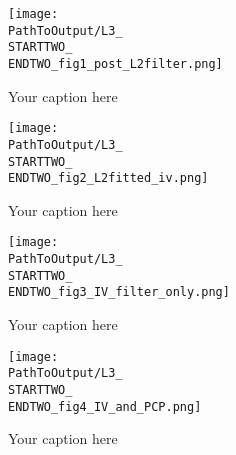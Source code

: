 \begin{appendix}
\begin{figure}[H] %
  \centering
  \texttt{[image: \\PathToOutput/L3\_\\STARTTWO\_\\ENDTWO\_fig1\_post\_L2filter.png]}%
  \caption{Your caption here}
  \label{fig:your_label}
\end{figure}


\begin{figure}[H] %
  \centering
  \texttt{[image: \\PathToOutput/L3\_\\STARTTWO\_\\ENDTWO\_fig2\_L2fitted\_iv.png]}%
  \caption{Your caption here}
  \label{fig:your_label}
\end{figure}


\begin{figure}[H] %
  \centering
  \texttt{[image: \\PathToOutput/L3\_\\STARTTWO\_\\ENDTWO\_fig3\_IV\_filter\_only.png]}%
  \caption{Your caption here}
  \label{fig:your_label}
\end{figure}


\begin{figure}[H] %
  \centering
  \texttt{[image: \\PathToOutput/L3\_\\STARTTWO\_\\ENDTWO\_fig4\_IV\_and\_PCP.png]}%
  \caption{Your caption here}
  \label{fig:your_label}
\end{figure}

\newpage


\end{appendix}


